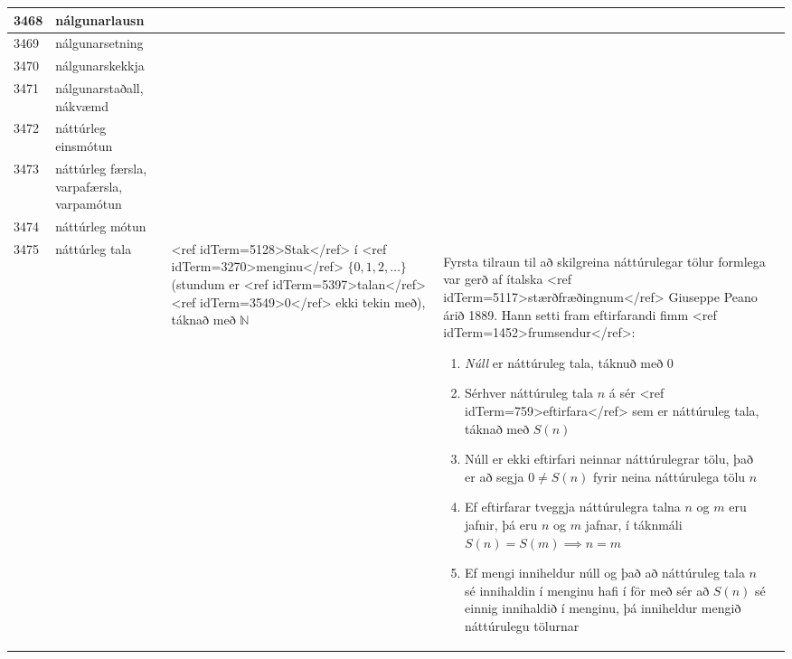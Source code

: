 \begin{longtable}{p{}|p{}|p{}|p{}|p{}}
\hline
3468 & nálgunarlausn &  &  &  \\
\hline
3469 & nálgunarsetning &  &  &  \\
\hline
3470 & nálgunarskekkja &  &  &  \\
\hline
3471 & nálgunarstaðall, nákvæmd &  &  &  \\
\hline
3472 & náttúrleg einsmótun &  &  &  \\
\hline
3473 & náttúrleg færsla, varpafærsla, varpamótun &  &  &  \\
\hline
3474 & náttúrleg mótun &  &  &  \\
\hline
3475 & náttúrleg tala & <ref idTerm=5128>Stak</ref> í <ref idTerm=3270>menginu</ref> $\{0, 1, 2, \dots\}$ (stundum er <ref idTerm=5397>talan</ref> <ref idTerm=3549>0</ref> ekki tekin með), táknað með $\mathbb{N}$ & Fyrsta tilraun til að skilgreina náttúrulegar tölur formlega var gerð af ítalska <ref idTerm=5117>stærðfræðingnum</ref> Giuseppe Peano árið 1889. Hann setti fram eftirfarandi fimm <ref idTerm=1452>frumsendur</ref>:

\begin{enumerate}
    \item \textit{Núll} er náttúruleg tala, táknuð með 0
    \item Sérhver náttúruleg tala $n$ á sér <ref idTerm=759>eftirfara</ref> sem er náttúruleg tala, táknað með $S(n)$
    \item Núll er ekki eftirfari neinnar náttúrulegrar tölu, það er að segja $0 \neq S(n)$ fyrir neina náttúrulega tölu $n$
    \item Ef eftirfarar tveggja náttúrulegra talna $n$ og $m$ eru jafnir, þá eru $n$ og $m$ jafnar, í táknmáli $S(n)=S(m)\implies n=m$
    \item Ef mengi inniheldur núll og það að náttúruleg tala $n$ sé innihaldin í menginu hafi í för með sér að $S(n)$ sé einnig innihaldið í menginu, þá inniheldur mengið náttúrulegu tölurnar
\end{enumerate}


\end{longtable}
